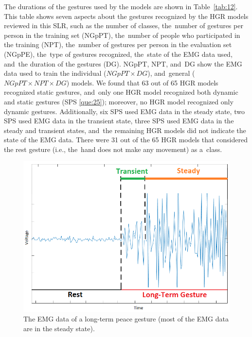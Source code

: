 \documentclass[sensors,review,accept,moreauthors,pdftex]{Definitions/mdpi}
\begin{document}
The durations of the gestures used by the models are shown in Table~\ref{tab:12}. This table shows seven aspects about the gestures recognized by the HGR models reviewed in this SLR, such as the number of classes, the~number of gestures per person in the training set (NGpPT), the~number of people who participated in the training (NPT), the~number of gestures per person in the evaluation set (NGpPE), the~type of gestures recognized, the~state of the EMG data used, and~the duration of the gestures (DG). NGpPT, NPT, and~DG show the EMG data used to train the individual (\begin{math}
NGpPT\times DG 
\end{math}), and~general (\begin{math}
NGpPT\times NPT\times DG 
\end{math}) models. We found that 63 out of 65 HGR models recognized static gestures, and~only one HGR model recognized both dynamic and static gestures (SPS \ref{que:25}); moreover, no HGR model recognized only dynamic gestures. Additionally, six SPS used EMG data in the steady state, two SPS used EMG data in the transient state, three SPS used EMG data in the steady and transient states, and~the remaining HGR models did not indicate the state of the EMG data. There were 31 out of the 65 HGR models that considered the rest gesture (i.e., the~hand does not make any movement) as a~class.


\begin{figure}[H]
	\centering
	\includegraphics[scale=0.8]{transientSteadypre}
	\caption{The EMG data of a long-term peace gesture (most of the EMG data are in the steady state).}
	\label{fig:5}
	
\end{figure}
\unskip
\end{document}
